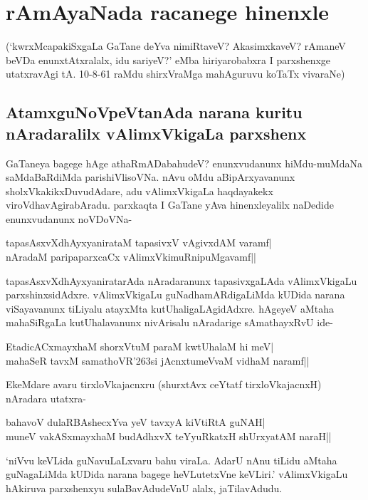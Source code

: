 \chapter{rAmAyaNada racanege hinenxle} 

(`kwrxMcapakiSxgaLa GaTane deYva nimiRtaveV? AkasimxkaveV? rAmaneV beVDa enunxtAtxralalx, idu sariyeV?' eMba hiriyarobabxra I parxshenxge utatxravAgi tA. 10-8-61 raMdu shirxVraMga mahAguruvu koTaTx vivaraNe) 

\section*{AtamxguNoVpeVtanAda narana kuritu nAradaralilx vAlimxVkigaLa parxshenx} 

GaTaneya bagege hAge athaRmADabahudeV? enunxvudanunx hiMdu-muMdaNa saMdaBaRdiMda parishiVlisoVNa. nAvu oMdu aBipArxyavanunx sholxVkakikxDuvudAdare, adu vAlimxVkigaLa haqdayakekx viroVdhavAgirabAradu. parxkaqta I GaTane yAva hinenxleyalilx naDedide enunxvudanunx noVDoVNa- 

\begin{shloka}
tapasAsxvXdhAyxyanirataM tapasivxV vAgivxdAM varamf|\label{194}\\ 
nAradaM paripaparxcaCx vAlimxVkimuRnipuMgavamf||
\end{shloka}

tapasAsxvXdhAyxyaniratarAda nAradaranunx tapasivxgaLAda vAlimxVkigaLu parxshinxsidAdxre. vAlimxVkigaLu guNadhamARdigaLiMda kUDida narana viSayavanunx tiLiyalu atayxMta kutUhaligaLAgidAdxre. hAgeyeV aMtaha mahaSiRgaLa kutUhalavanunx nivArisalu nAradarige sAmathayxRvU ide- 

\begin{shloka} 
EtadicACxmayxhaM shorxVtuM paraM kwtUhalaM hi meV|\label{194d}\\ 
mahaSeR tavxM samathoVR\char'263si jAcnxtumeVvaM vidhaM naramf||
\end{shloka}

EkeMdare avaru tirxloVkajacnxru (shurxtAvx ceYtatf tirxloVkajacnxH)\label{194c} nAradara utatxra- 

\begin{shloka} 
bahavoV dulaRBAshecxYva yeV tavxyA kiVtiRtA guNAH|\label{194a}\\ 
muneV vakASxmayxhaM budAdhxvX teYyuRkatxH shUrxyatAM naraH|| 
\end{shloka}


`niVvu keVLida guNavuLaLxvaru bahu viraLa. AdarU nAnu tiLidu aMtaha guNagaLiMda kUDida narana bagege heVLutetxVne keVLiri.' vAlimxVkigaLu hAkiruva parxshenxyu sulaBavAdudeVnU alalx, jaTilavAdudu. 


